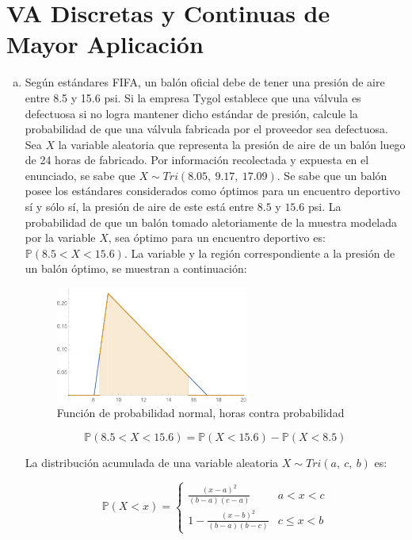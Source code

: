 \documentclass[11pt, spanish]{article}
\begin{document}
\section{VA Discretas y Continuas de Mayor Aplicación}

\begin{enumerate}[(a)]

\item Según estándares FIFA, un balón oficial debe de tener una presión de aire entre
8.5 y 15.6 psi. Si la empresa Tygol establece que una válvula es defectuosa si no logra
mantener dicho estándar de presión, calcule la probabilidad de que una válvula fabricada por
el proveedor sea defectuosa.\\

Sea $X$ la variable aleatoria que representa la presión de aire de un balón luego de 24 horas de fabricado. Por información recolectada y expuesta en el enunciado, se sabe que $X \sim Tri(8.05,\  9.17,\ 17.09)$. Se sabe que un balón posee los estándares considerados como óptimos para un encuentro deportivo sí y sólo sí, la presión de aire de este está entre $8.5$ y $15.6$ psi. La probabilidad de que un balón tomado aletoriamente de la muestra modelada por la variable $X$, sea óptimo para un encuentro deportivo es: $\mathbb{P}(8.5 < X < 15.6)$. La variable y la región correspondiente a la presión de un balón óptimo, se muestran a continuación:

\begin{figure}[h]
    \centering
    \includegraphics[width=0.6\textwidth]{fig1-1.png}
    \caption{Función de probabilidad normal, horas contra probabilidad}
    \label{fig:prob_dist1}
\end{figure}

$$\mathbb{P}(8.5 < X < 15.6) = \mathbb{P}(X < 15.6) - \mathbb{P}(X < 8.5)$$

La distribución acumulada de una variable aleatoria $X \sim Tri(a,\ c,\ b)$ es:

\[ \mathbb{P}(X < x) = \begin{cases} 
      \frac{(x - a)^2}{(b - a)(c - a)} & a < x < c \\
      1 - \frac{(x - b)^2}{(b - a)(b - c)} & c \leq x < b
   \end{cases}
\]


\end{enumerate}
\end{document}
